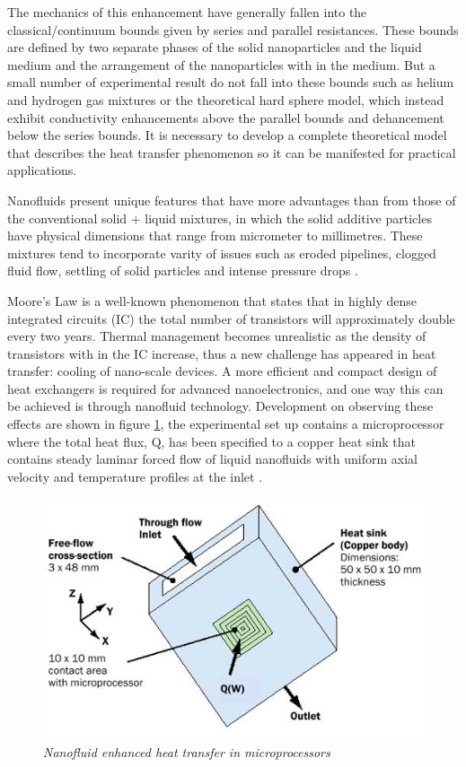 \documentclass{article}
\begin{document}
The mechanics of this enhancement have generally fallen into the classical/continuum bounds given by series and parallel resistances. These bounds are defined by two separate phases of the solid nanoparticles and the liquid medium and the arrangement of the nanoparticles with in the medium. But a small number of experimental result do not fall into these bounds such as helium and hydrogen gas mixtures or the theoretical hard sphere model, which instead exhibit conductivity enhancements above the parallel bounds and dehancement below the series bounds. It is necessary to develop a complete theoretical model that describes the heat transfer phenomenon so it can be manifested for practical applications.

Nanofluids present unique features that have more advantages than from those of the conventional solid + liquid mixtures, in which the solid additive particles have physical dimensions that range from micrometer to millimetres. These mixtures tend to incorporate varity of issues such as eroded pipelines, clogged fluid flow, settling of solid particles and intense pressure drops \cite{xuan2000conceptions}. 

Moore's Law is a well-known phenomenon that states that in highly dense integrated circuits (IC) the total number of transistors will approximately double every two years. Thermal management becomes unrealistic as the density of transistors with in the IC increase, thus a new challenge has appeared in heat transfer: cooling of nano-scale devices. A more efficient and compact design of heat exchangers is required for advanced nanoelectronics, and one way this can be achieved is through nanofluid technology. Development on observing these effects are shown in figure \ref{fig:microprocessor}, the experimental set up contains a microprocessor where the total heat flux, Q, has been specified to a copper heat sink that contains steady laminar forced flow of liquid nanofluids with uniform axial velocity and temperature profiles at the inlet \cite{nguyen_2018}. 
	
	\begin{figure}[h] 
		\centering
		\includegraphics[scale=0.5]{img1}
		\caption{\textit{Nanofluid enhanced heat transfer in microprocessors}}
		\label{fig:microprocessor}
	\end{figure}
\end{document}
